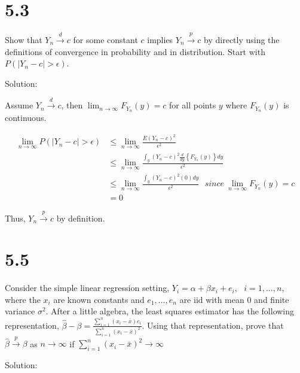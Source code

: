 \documentclass[
  letterpaper,
  DIV=11,
  numbers=noendperiod]{scrreprt}
\begin{document}
\newpage

\hypertarget{section-28}{%
\section{5.3}\label{section-28}}

Show that \(Y_n \overset d \to c\) for some constant \(c\) implies
\(Y_n \overset p \to c\) by directly using the definitions of
convergence in probability and in distribution. Start with
\(P(|Y_n-c| > \epsilon)\).

Solution:

Assume \(Y_n \overset d \to c\), then
\(\lim_{n \to \infty} F_{Y_n}(y) = c\) for all points \(y\) where
\(F_{Y_n}(y)\) is continuous.

\[ \begin{aligned}
\lim_{n \to \infty}P(|Y_n-c| > \epsilon) &\leq \lim_{n \to \infty}\frac{E(Y_n-c)^2}{\epsilon^2} \\
&\leq \lim_{n \to \infty}\frac{\int_y(Y_n-c)^2 \frac{d}{dy}\left\{F_{Y_n}(y)\right\}dy}{\epsilon^2} \\
&\leq \lim_{n \to \infty}\frac{\int_y(Y_n-c)^2 (0)dy}{\epsilon^2} ~~~since~\lim_{n \to \infty} F_{Y_n}(y) = c\\
&= 0
\end{aligned}\]

Thus, \(Y_n \overset p \to c\) by definition.

\newpage

\hypertarget{section-29}{%
\section{5.5}\label{section-29}}

Consider the simple linear regression setting,
\(Y_i = \alpha + \beta x_i + e_i, ~~~i=1,\dots, n\), where the \(x_i\)
are known constants and \(e_1, \dots, e_n\) are iid with mean \(0\) and
finite variance \(\sigma^2\). After a little algebra, the least squares
estimator has the following representation,
\(\hat \beta - \beta = \frac{\sum_{i=1}^n (x_i-\bar x)e_i}{\sum_{i=1}^n (x_i-\bar x)^2}\).
Using that representation, prove that
\(\hat \beta \overset p \to \beta\) as \(n \to \infty\) if
\(\sum_{i=1}^n(x_i-\bar x)^2 \to \infty\)

Solution:
\end{document}
